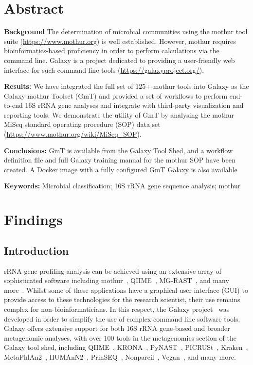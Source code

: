 \section*{Abstract}
\textbf{Background} The determination of microbial communities using the mothur tool suite (\url{https://www.mothur.org}) is well established. However, mothur requires bioinformatics-based proficiency in order to perform calculations via the command line. Galaxy is a project dedicated to providing a user-friendly web interface for such command line tools (\url{https://galaxyproject.org/}).

\textbf{Results:} We have integrated the full set of 125+ mothur tools into Galaxy as the Galaxy mothur Toolset (GmT) and provided a set of workflows to perform end-to-end 16S rRNA gene analyses and integrate with third-party visualization and reporting tools.  We demonstrate the utility of GmT by analysing the mothur MiSeq standard operating procedure (SOP) data set (\url{https://www.mothur.org/wiki/MiSeq\_SOP}).

\textbf{Conclusions:} GmT is available from the Galaxy Tool Shed, and a workflow definition file and full Galaxy training manual for the mothur SOP have been created. A Docker image with a fully configured GmT Galaxy is also available

\textbf{Keywords:} Microbial classification; 16S rRNA gene sequence analysis; mothur

\section*{Findings}

\subsection*{Introduction}
 rRNA gene profiling analysis can be achieved using an extensive array of sophisticated software including mothur~\cite{schloss2009introducing}, QIIME~\cite{caporaso2010qiime}, MG-RAST~\cite{glass2010using}, and many more~\cite{oulas2015metagenomics}. Whilst some of these applications have a graphical user interface (GUI) to provide access to these technologies for the research scientist, their use remains complex for non-bioinformaticians. In this respect, the Galaxy project~\cite{afgan2016galaxy} was developed in order to simplify the use of complex command line software tools. Galaxy offers extensive support for both 16S rRNA gene-based and broader metagenomic analyses, with over 100 tools in the metagenomics section of the Galaxy tool shed, including QIIME~\cite{caporaso2010qiime}, KRONA~\cite{ondov2011interactive}, PyNAST~\cite{caporaso2009pynast}, PICRUSt~\cite{langille2013predictive}, Kraken~\cite{wood2014kraken}, MetaPhlAn2~\cite{truong2015metaphlan2}, HUMAnN2~\cite{abubucker2012metabolic}, PrinSEQ~\cite{schmieder2011quality}, Nonpareil~\cite{rodriguez2013nonpareil}, Vegan~\cite{dixon2003vegan}, and many more.

